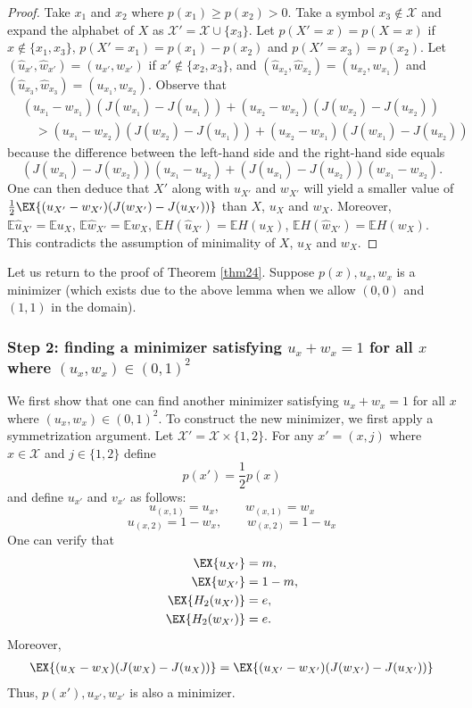 \documentclass[conference,letterpaper,onecolumn]{IEEEtran}
\theoremstyle{plain}%
\begin{document}
\begin{proof}
Take $x_1$ and $x_2$ where $p(x_1)\geq p(x_2)>0$. Take a symbol $x_3\notin \mathcal{X}$ and expand the alphabet of $X$ as  $\mathcal{X}'=\mathcal{X}\cup \{x_3\}$. Let $p(X'=x)=p(X=x)$ if $x\notin \{x_1,x_3\}$, $p(X'=x_1)=p(x_1)-p(x_2)$ and $p(X'=x_3)=p(x_2)$. Let $(\hat u_{x'},\hat w_{x'})=(u_{x'},w_{x'})$ if $x'\notin \{x_2,x_3\}$, and 
$(\hat u_{x_2},\hat w_{x_2})=(u_{x_2},w_{x_1})$
and
$(\hat u_{x_3},\hat w_{x_3})=(u_{x_1},w_{x_2})$. Observe that 
{\begin{align*}
    &(u_{x_1}-w_{x_1})(J(w_{x_1})-J(u_{x_1}))+(u_{x_2}-w_{x_2})(J(w_{x_2})-J(u_{x_2}))\\
    &\quad>(u_{x_1}-w_{x_2})(J(w_{x_2})-J(u_{x_1}))+(u_{x_2}-w_{x_1})(J(w_{x_1})-J(u_{x_2}))
\end{align*}}
because the difference between the left-hand side and the right-hand side equals
$$(J(w_{x_1})- J(w_{x_2}))(u_{x_1}-u_{x_2})+ (J(u_{x_1})- J(u_{x_2}))(w_{x_1} -w_{x_2} ).$$
One can then deduce that $X'$ along with $u_{X'}$ and $w_{X'}$ will yield a smaller value of
$\frac{1}{2}\EX{(u_{X'}-w_{X'})(J(w_{X'}) - J(u_{X'}))}$ than $X$, $u_X$ and $w_X$. Moreover, $\mathbb{E}\hat u_{X'}=\mathbb{E}u_{X}$, $\mathbb{E}\hat w_{X'}=\mathbb{E}w_{X}$, $\mathbb{E}H(\hat u_{X'})=\mathbb{E}H(u_{X})$, $\mathbb{E}H(\hat w_{X'})=\mathbb{E}H(w_{X})$. This contradicts the assumption of minimality of $X$, $u_X$ and $w_X$.
\end{proof}


Let us return to the proof of Theorem \ref{thm24}. 
Suppose $p(x), u_x, w_x$ is a minimizer (which exists due to the above lemma when we allow $(0,0)$ and $(1,1)$ in the domain). 

\subsubsection{Step 2: finding a minimizer satisfying $u_x+w_x=1$ for all $x$ where $(u_x,w_x)\in(0,1)^2$ }
We first show that one can find another minimizer satisfying $u_x+w_x=1$ for all $x$ where $(u_x,w_x)\in(0,1)^2$. 
To construct the new minimizer, we first apply a symmetrization argument. Let $\mathcal{X}'=\mathcal{X}\times\{1,2\}$. For any $x'=(x,j)$ where $x\in\mathcal{X}$ and $j\in\{1,2\}$ define
$$p(x')=\frac12 p(x)$$
and define $u_{x'}$ and $v_{x'}$ as follows: 
$$u_{(x,1)}=u_x, \qquad w_{(x,1)}=w_x$$
$$u_{(x,2)}=1-w_x, \qquad w_{(x,2)}=1-u_x$$
One can verify that
\begin{align*}
\EX{u_{X'}} &= m,\\
    \EX{w_{X'}} &= 1-m,\\
    \EX{H_2(u_{X'})} &= e,\\
    \EX{H_2(w_{X'})} &= e.
\end{align*}
Moreover, 
{\begin{align*}
    \EX{(u_X-w_X)(J(w_X) - J(u_X))}=
    \EX{(u_{X'}-w_{X'})(J(w_{X'}) - J(u_{X'}))}
\end{align*}}
Thus, $p(x'), u_{x'}, w_{x'}$ is also a minimizer.
\end{document}
